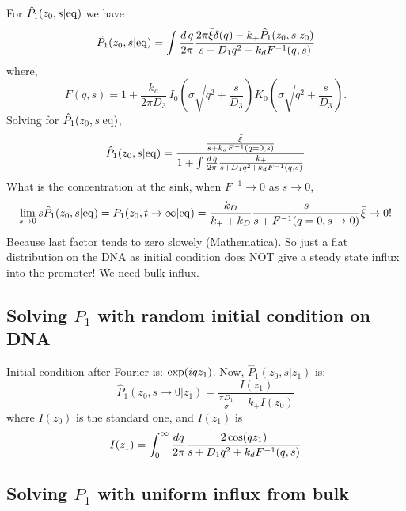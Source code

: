 \documentclass[a4paper,10pt]{article}
\begin{document}
For $\hat{P}_1(z_0,s|{\rm eq})$ we have
\begin{equation}
 \hat{P}_1(z_0,s|{\rm eq}) = \int \frac{d\,q}{2 \pi} \frac{2 \pi \bar{\xi} \delta (q) - k_+ \hat{P}_1(z_0,s|z_0)}{s + D_1 q^2+k_d F^{-1}(q,s)}
\end{equation}
where,
\begin{equation}
F(q,s) = 1 + \frac{k_a}{2 \pi D_3} \, I_{0}\left( \sigma \sqrt{q^2 + \frac{s}{D_3}} \right) K_{0}\left( \sigma \sqrt{q^2 + \frac{s}{D_3}} \right).
\end{equation}
Solving for $\hat{P}_1(z_0,s|{\rm eq})$,
\begin{equation}
 \hat{P}_1(z_0,s|{\rm eq}) = \frac{\frac{\bar{\xi}}{s + k_d F^{-1}(q=0,s)}}{1 + \int \frac{d\,q}{2 \pi} \frac{k_+}{s + D_1 q^2 + k_d F^{-1}(q,s)}}
\end{equation}
What is the concentration at the sink, when $F^{-1} \to 0$ as $s\to0$,
\begin{equation}
 \lim_{s\to0} s \hat{P}_1(z_0,s|{\rm eq}) = {P}_1(z_0,t\to\infty|{\rm eq}) = \frac{k_D}{k_+ + k_D} \frac{s}{s + F^{-1}(q=0,s\to0)} \bar{\xi} \to 0!
\end{equation}
Because last factor tends to zero slowely (Mathematica). So just a flat distribution on the DNA as initial condition does NOT give a steady state influx into the promoter! We need bulk influx.

\subsection{Solving $P_1$ with random initial condition on DNA}
Initial condition after Fourier is: ${\rm exp}(i q z_1)$. Now, $\hat{P}_1(z_0,s|z_1)$ is:
\begin{equation}
 \hat{P}_1(z_0,s\to0|z_1) = \frac{I(z_1)}{\frac{\pi D_1}{\sigma} + k_+ I(z_0)}
\end{equation}
where $I(z_0)$ is the standard one, and $I(z_1)$ is
\begin{equation}
 I(z_1) = \int_0^{\infty} \frac{dq}{2 \pi} \frac{2 \, {\rm cos}(q z_1)}{s + D_1 q^2 + k_d F^{-1}(q,s)}
\end{equation}

\subsection{Solving $P_1$ with uniform influx from bulk}
\end{document}
